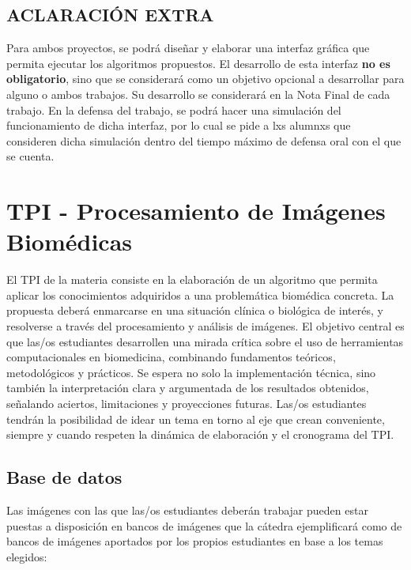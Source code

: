 \documentclass[10pt]{article}
\begin{document}
\vspace{0.25cm}

\subsection*{ACLARACIÓN EXTRA}

Para ambos proyectos, se podrá diseñar y elaborar una interfaz gráfica que permita ejecutar los algoritmos propuestos. El desarrollo de esta interfaz \textbf{no es obligatorio}, sino que se considerará como un objetivo opcional a desarrollar para alguno o ambos trabajos. Su desarrollo se considerará en la Nota Final de cada trabajo. En la defensa del trabajo, se podrá hacer una simulación del funcionamiento de dicha interfaz, por lo cual se pide a lxs alumnxs que consideren dicha simulación dentro del tiempo máximo de defensa oral con el que se cuenta.

\newpage

\section{TPI - Procesamiento de Imágenes Biomédicas}

El TPI de la materia consiste en la elaboración de un algoritmo que permita aplicar los conocimientos adquiridos a una problemática biomédica concreta. La propuesta deberá enmarcarse en una situación clínica o biológica de interés, y resolverse a través del procesamiento y análisis de imágenes. El objetivo central es que las/os estudiantes desarrollen una mirada crítica sobre el uso de herramientas computacionales en biomedicina,
combinando fundamentos teóricos, metodológicos y prácticos. Se espera no solo la implementación técnica, sino también la interpretación clara y argumentada de los resultados obtenidos, señalando aciertos, limitaciones y proyecciones futuras.
Las/os estudiantes tendrán la posibilidad de idear un tema en torno al eje que crean conveniente, siempre y cuando respeten la dinámica de elaboración y el cronograma del TPI.

\subsection*{Base de datos}
Las imágenes con las que las/os estudiantes deberán trabajar pueden estar puestas a disposición en bancos de imágenes que la cátedra ejemplificará como de bancos de imágenes aportados por los propios estudiantes en base a los temas elegidos: 
\end{document}
